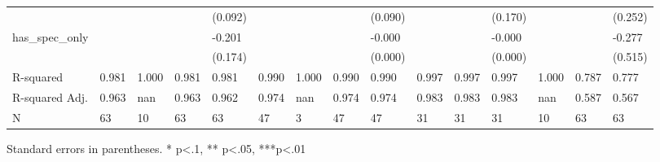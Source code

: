 \begin{table}
\begin{center}
\begin{tabular}{lllllllllllllll}
                  &                    &                    &                        & (0.092)             &                      &                      &                          & (0.090)               &                      &                          & (0.170)               &                               &                                           & (0.252)                                 \\
has\_spec\_only   &                    &                    &                        & -0.201              &                      &                      &                          & -0.000                &                      &                          & -0.000                &                               &                                           & -0.277                                  \\
                  &                    &                    &                        & (0.174)             &                      &                      &                          & (0.000)               &                      &                          & (0.000)               &                               &                                           & (0.515)                                 \\
R-squared         & 0.981              & 1.000              & 0.981                  & 0.981               & 0.990                & 1.000                & 0.990                    & 0.990                 & 0.997                & 0.997                    & 0.997                 & 1.000                         & 0.787                                     & 0.777                                   \\
R-squared Adj.    & 0.963              & nan                & 0.963                  & 0.962               & 0.974                & nan                  & 0.974                    & 0.974                 & 0.983                & 0.983                    & 0.983                 & nan                           & 0.587                                     & 0.567                                   \\
N                 & 63                 & 10                 & 63                     & 63                  & 47                   & 3                    & 47                       & 47                    & 31                   & 31                       & 31                    & 10                            & 63                                        & 63                                      \\
\hline
\end{tabular}
\end{center}
\end{table}
\bigskip
Standard errors in parentheses. \newline 
* p<.1, ** p<.05, ***p<.01